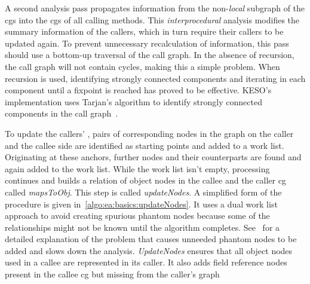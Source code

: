 			A second analysis pass propagates information from the non-\emph{local} subgraph of the \glspl{cg} into the
			\glspl{cg} of all calling methods. This \emph{interprocedural} analysis modifies the summary information of the
			callers, which in turn require their callers to be updated again. To prevent unnecessary recalculation of
			information, this pass should use a bottom-up traversal of the call graph. In the absence of recursion, the call
			graph will not contain cycles, making this a simple problem. When recursion is used, identifying strongly
			connected components and iterating in each component until a fixpoint is reached has proved to be effective.
			KESO's implementation uses Tarjan's algorithm to identify strongly connected components in the call
			graph~\cite{tarjan:72:lga}.

			To update the callers' , pairs of corresponding nodes in the graph on the caller and the callee side
			are identified as starting points and added to a work list. Originating at these anchors, further nodes and their
			counterparts are found and again added to the work list. While the work list isn't empty, processing continues and
			builds a relation of object nodes in the callee and the caller \gls{cg} called \emph{mapsToObj}. This step is
			called \emph{updateNodes}. A simplified form of the procedure is given in~\cref{algo:ea:basics:updateNodes}. It
			uses a dual work list approach to avoid creating spurious phantom nodes because some of the relationships might
			not be known until the algorithm completes. See~\cite[Sec. 3.2.1]{lang:12} for a detailed explanation of the
			problem that causes unneeded phantom nodes to be added and slows down the analysis. \emph{UpdateNodes} ensures
			that all object nodes used in a callee are represented in its caller. It also adds field reference nodes present
			in the callee \gls{cg} but missing from the caller's graph

